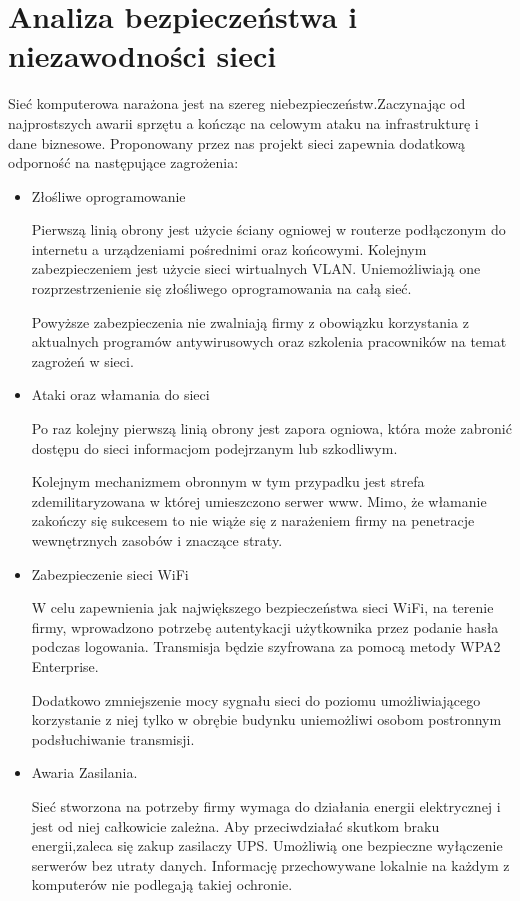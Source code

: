\documentclass{report}
\begin{document}
\section{Analiza bezpieczeństwa i niezawodności sieci}
Sieć komputerowa narażona jest na szereg niebezpieczeństw.Zaczynając od 
najprostszych awarii sprzętu a kończąc na celowym ataku na infrastrukturę i dane biznesowe.
Proponowany przez nas projekt sieci zapewnia dodatkową odporność na następujące zagrożenia:
\begin{itemize}


\item{Złośliwe oprogramowanie}

Pierwszą linią obrony jest użycie ściany ogniowej
w routerze podłączonym do internetu a urządzeniami pośrednimi oraz
końcowymi. Kolejnym  zabezpieczeniem
jest użycie sieci wirtualnych VLAN. Uniemożliwiają one rozprzestrzenienie się złośliwego oprogramowania na całą sieć.           

Powyższe zabezpieczenia nie zwalniają firmy z obowiązku korzystania z 
aktualnych programów antywirusowych oraz szkolenia pracowników na temat zagrożeń w sieci.

\item {Ataki oraz włamania do sieci}

Po raz kolejny pierwszą linią obrony jest zapora ogniowa,
która może zabronić dostępu do sieci informacjom podejrzanym lub
szkodliwym. 

Kolejnym mechanizmem obronnym w tym przypadku jest strefa zdemilitaryzowana w której umieszczono serwer www.
Mimo, że  włamanie zakończy się sukcesem to nie wiąże się z
narażeniem firmy na penetracje wewnętrznych zasobów i znaczące straty.

\item {Zabezpieczenie sieci  WiFi}

W celu zapewnienia jak największego bezpieczeństwa sieci
WiFi, na terenie firmy, wprowadzono potrzebę autentykacji
użytkownika przez podanie hasła podczas logowania. Transmisja będzie szyfrowana za pomocą metody WPA2 Enterprise.

Dodatkowo zmniejszenie mocy sygnału sieci do poziomu umożliwiającego korzystanie z niej tylko w obrębie budynku
uniemożliwi osobom postronnym podsłuchiwanie transmisji.

\item Awaria Zasilania.

Sieć stworzona na potrzeby firmy wymaga do działania energii
elektrycznej i jest od niej całkowicie zależna. Aby przeciwdziałać skutkom braku energii,zaleca się zakup zasilaczy UPS.
Umożliwią one bezpieczne wyłączenie serwerów bez utraty danych. Informację przechowywane lokalnie na
każdym z komputerów nie podlegają takiej ochronie.


\end{itemize}
\end{document}
